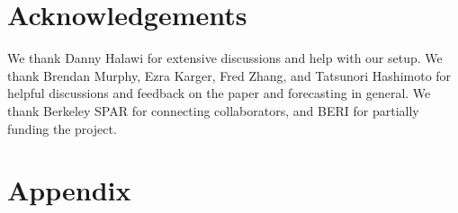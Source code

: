 \section*{Acknowledgements}
We thank Danny Halawi for extensive discussions and help with our setup. We thank Brendan Murphy, Ezra Karger, Fred Zhang, and Tatsunori Hashimoto for helpful discussions and feedback on the paper and forecasting in general.
We thank Berkeley SPAR for connecting collaborators, and BERI for partially funding the project.


\section{Appendix}









